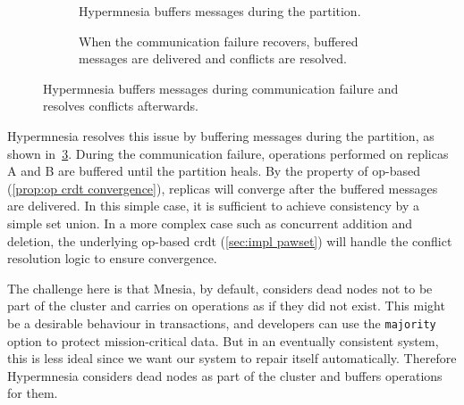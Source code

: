 \begin{figure}[htp]
\begin{subfigure}[t]{0.3\textwidth}
    \caption{Hypermnesia buffers messages during the partition.}
    \label{subfig:hypermnesia comm failure b}
  \end{subfigure}

  \begin{subfigure}[t]{0.3\textwidth}
    \centering
    \caption{When the communication failure recovers, buffered messages are delivered
    and conflicts are resolved.}
    \label{fig:hypermnesia comm failure}
  \end{subfigure}
  \caption{Hypermnesia buffers messages during communication failure and resolves
  conflicts afterwards.}
\end{figure}


Hypermnesia resolves this issue by buffering messages during the partition, as
shown in~\cref{fig:hypermnesia comm failure}. During the communication failure, 
operations performed on replicas A and B are buffered until the partition heals. 
By the property of op-based  (\cref{prop:op crdt convergence}),
replicas will converge after the buffered messages are delivered.
In this simple case, it is sufficient to achieve consistency by a simple set 
union. In a more complex case
such as concurrent addition and deletion, the underlying op-based 
\acrshort{crdt} (\cref{sec:impl pawset}) will handle the conflict resolution 
logic to ensure convergence.

The challenge here is that Mnesia, by default, considers dead nodes not to be 
part of the
cluster and carries on operations as if they did not exist. This might be a
desirable behaviour in transactions, and developers can use the \texttt{majority}
option to protect mission-critical data. But in an eventually consistent system,
this is less ideal since we want our system to repair itself automatically.
Therefore Hypermnesia considers dead nodes as part of the cluster and buffers
operations for them.

